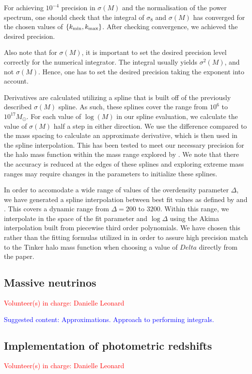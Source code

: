 \documentclass[\docopts]{\docclass}
\newcommand{\vol}[1]{\textcolor{red}{Volunteer(s) in charge: #1}}
\newcommand{\cont}[1]{\textcolor{blue}{Suggested content: #1}}
\begin{document}
For achieving $10^{-4}$ precision in $\sigma(M)$ and the normalisation of the power spectrum, one should check that the integral of $\sigma_8$ and $\sigma(M)$ has converged for the chosen values of $\{k_{\rm min},k_{\rm max}\}$. After checking convergence, we achieved the desired precision.

Also note that for $\sigma(M)$, it is important to set the desired precision level correctly for the numerical integrator. The integral usually yields $\sigma^2(M)$, and not $\sigma(M)$. Hence, one has to set the desired precision taking the exponent into account.

Derivatives are calculated utilizing a spline that is built off of the previously described $\sigma(M)$ spline. As such, these splines cover the range from $10^6$ to $10^{17} M_\odot$. For each value of $\log(M)$ in our spline evaluation, we calculate the value of $\sigma(M)$ half a step in either direction. We use the difference compared to the mass spacing to calculate an approximate derivative, which is then used in the spline interpolation. This has been tested to meet our necessary precision for the halo mass function within the mass range explored by \citet{Tinker2010}. We note that there the accuracy is reduced at the edges of these splines and exploring extreme mass ranges may require changes in the parameters to initialize these splines.

In order to accomodate a wide range of values of the overdensity parameter $\Delta$, we have generated a spline interpolation between best fit values as defined by \citet{Tinker2008} and \citet{Tinker2010}. This covers a dynamic range from $\Delta=200$ to $3200$. Within this range, we interpolate in the space of the fit parameter and $\log\Delta$ using the Akima interpolation built from piecewise third order polynomials. We have chosen this rather than the fitting formulas utilized in \citet{Tinker2010} in order to assure high precision match to the Tinker halo mass function when choosing a value of $Delta$ directly from the paper. 


\subsection{Massive neutrinos}
\vol{Danielle Leonard}

\cont{Approximations. Approach to performing integrals.}

\subsection{Implementation of photometric redshifts}
\vol{Danielle Leonard}
\end{document}
